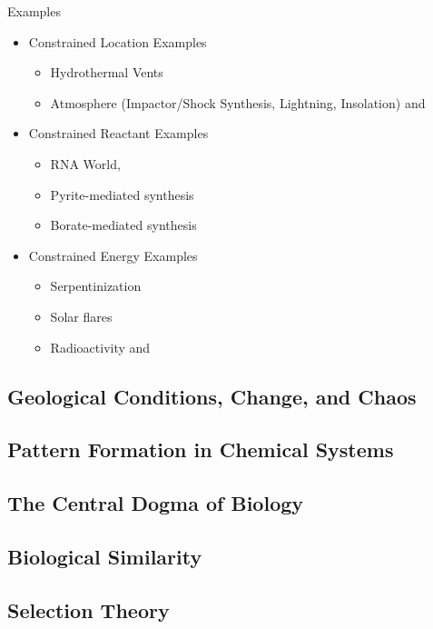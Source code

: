 \documentclass[]{article}
\begin{document}
Examples
\begin{itemize}
	\item Constrained Location Examples \begin{itemize}
		\item Hydrothermal Vents\cite{martin2006origin}
		\item Atmosphere (Impactor/Shock Synthesis, Lightning,
		Insolation)\cite{chyba1992endogenous} and \cite{miller1959organic}
	\end{itemize}
	\item Constrained Reactant Examples 
	\begin{itemize}
		\item RNA World\cite{powner2009synthesis},
		\item Pyrite-mediated synthesis\cite{wachtershauser1993cradle}
		\item Borate-mediated synthesis\cite{grew2011borate}
	\end{itemize}
	\item Constrained Energy Examples
	\begin{itemize}
		\item Serpentinization\cite{schrenk2013serpentinization}
		\item Solar flares\cite{airapetian2016prebiotic}
		\item Radioactivity\cite{yi2018radiolytic} and \cite{adam2018estimating}
	\end{itemize}
\end{itemize}
\subsection{Geological Conditions, Change, and Chaos}
\subsection{Pattern Formation in Chemical Systems}
\subsection{The Central Dogma of Biology}
\cite{crick1958biological} \cite{crick1970central}
\subsection{Biological Similarity}
\subsection{Selection Theory}
\cite{eigen1978hypercycle} \cite{eigen1988molecular} \cite{eigen2002error} \cite{crotty2001rna} \cite{stadtler2002fitness_landscapes}
\end{document}
